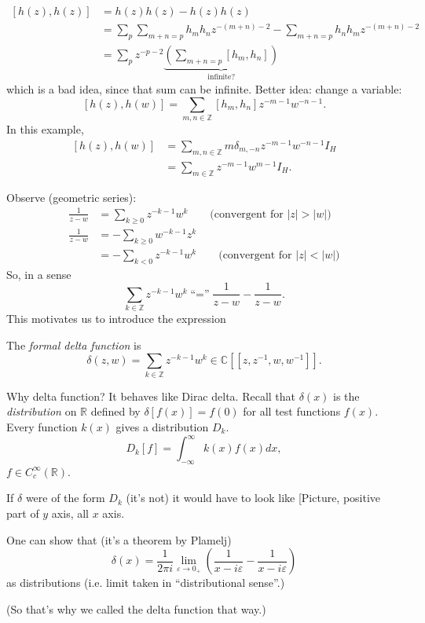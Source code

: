 $$
\begin{aligned}
[h(z),h(z)]&=h(z)h(z)-h(z)h(z)\\
&=\sum_{p}\sum_{m+n=p}h_mh_nz^{-(m+n)-2}
-\sum_{m+n=p}h_nh_mz^{-(m+n)-2}\\
&=\sum_p
z^{-p-2}\underbrace{\left(\sum_{m+n=p}[h_m,
h_n]\right)}
_{\text{infinite?}}
\end{aligned}
$$
which is a bad idea, since that sum can be
infinite.
Better idea: change a variable:
$$
[h(z),h(w)]=\sum_{m,n \in
\mathbb{Z}}[h_m,h_n]z^{-m-1}w^{-n-1}.
$$
In this example,
$$
\begin{aligned}
[h(z),h(w)]&=\sum_{m,n \in \mathbb{Z}}m
\delta_{m,-n}z^{-m-1}
w^{-n-1}I_H\\
&=\sum_{m \in \mathbb{Z}}z^{-m-1}w^{m-1}I_H.
\end{aligned}
$$

Observe (geometric series):
$$
\begin{aligned}
\frac{1}{z-w}&=\sum_{k \geq
0}z^{-k-1}w^k\qquad
\text{(convergent for $|z|>|w|$)}\\
\frac{1}{z-w}&=-\sum_{k \geq 0}w^{-k-1}z^k\\
&=-\sum_{k<0}z^{-k-1}w^k\qquad
\text{(convergent for $|z|<|w|$)}
\end{aligned}
$$
So, in a sense
$$
\sum_{k \in
\mathbb{Z}}z^{-k-1}w^k\text{``$=$''}\frac{1}
{z-w}
-\frac{1}{z-w}.
$$
This motivates us to introduce the expression
\begin{definition}
\label{definition-delta-function}
The {\it formal delta function} is
$$
\delta(z,w)=\sum_{k \in
\mathbb{Z}}z^{-k-1}w^k \in
\mathbb{C}[\![z,z^{-1},w,w^{-1}]\!].
$$
\end{definition}
Why delta function? It behaves like Dirac
delta.
Recall that $\delta(x)$ is the
{\it distribution} on $\mathbb{R}$ defined by
$\delta[f(x)]=f(0)$ for all test functions
$f(x)$.
Every function $k(x)$ gives a distribution
$D_k$.
$$
D_k[f]=\int_{-\infty}^\infty k(x)f(x)dx,
$$
$f \in C_c^\infty(\mathbb{R})$.

If $\delta$ were of the form $D_k$ (it's not)
it would have to look like
[Picture, positive part of $y$ axis, all $x$
axis.

One can show that (it's a theorem by Plamelj)
$$
\delta(x)=\frac{1}{2\pi i}\lim_{\varepsilon
\to 0_+}
\left(\frac{1}{x-i \varepsilon}-\frac{1}{x-i
\varepsilon}\right)
$$
as distributions (i.e. limit taken in
``distributional sense''.)

(So that's why we called the delta function
that way.)

